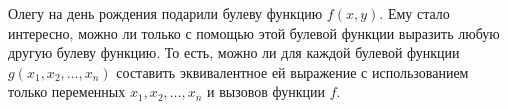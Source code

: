 Олегу на день рождения подарили булеву функцию $f(x, y)$. Ему стало интересно, можно ли только с помощью этой булевой функции выразить любую другую булеву функцию. То есть, можно ли для каждой булевой функции $g(x_1, x_2, \ldots, x_n)$ составить эквивалентное ей выражение с использованием только переменных $x_1, x_2, \ldots, x_n$ и вызовов функции $f$.